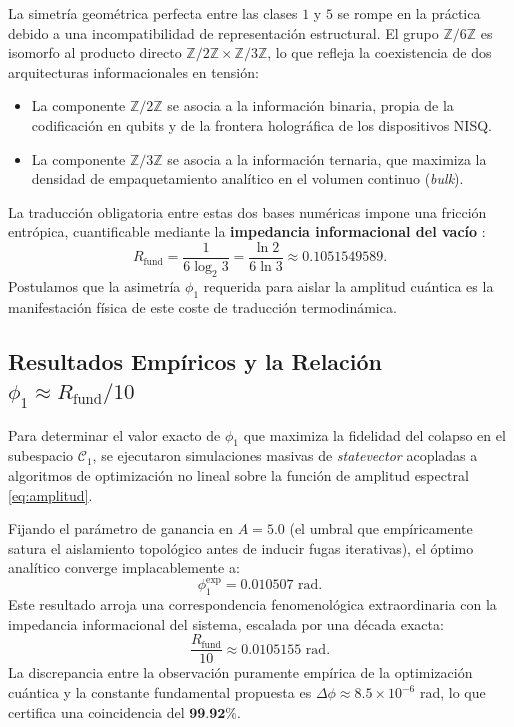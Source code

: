 \documentclass[12pt,a4paper]{article}
\theoremstyle{plain}
\theoremstyle{definition}
\theoremstyle{remark}
\begin{document}
La simetría geométrica perfecta entre las clases $1$ y $5$ se rompe en la práctica debido a una incompatibilidad de representación estructural. El grupo $\mathbb{Z}/6\mathbb{Z}$ es isomorfo al producto directo $\mathbb{Z}/2\mathbb{Z} \times \mathbb{Z}/3\mathbb{Z}$, lo que refleja la coexistencia de dos arquitecturas informacionales en tensión:
\begin{itemize}
    \item La componente $\mathbb{Z}/2\mathbb{Z}$ se asocia a la información binaria, propia de la codificación en qubits y de la frontera holográfica de los dispositivos NISQ.
    \item La componente $\mathbb{Z}/3\mathbb{Z}$ se asocia a la información ternaria, que maximiza la densidad de empaquetamiento analítico en el volumen continuo (\textit{bulk}).
\end{itemize}
La traducción obligatoria entre estas dos bases numéricas impone una fricción entrópica, cuantificable mediante la \textbf{impedancia informacional del vacío} \cite{PeinadorGenesis}:
\begin{equation}
R_{\text{fund}} = \frac{1}{6\log_2 3} = \frac{\ln 2}{6\ln 3} \approx 0.1051549589.
\label{eq:rfund}
\end{equation}
Postulamos que la asimetría $\phi_1$ requerida para aislar la amplitud cuántica es la manifestación física de este coste de traducción termodinámica.

\subsection{Resultados Empíricos y la Relación $\phi_1 \approx R_{\text{fund}}/10$}

Para determinar el valor exacto de $\phi_1$ que maximiza la fidelidad del colapso en el subespacio $\mathcal{C}_1$, se ejecutaron simulaciones masivas de \textit{statevector} acopladas a algoritmos de optimización no lineal sobre la función de amplitud espectral \eqref{eq:amplitud}. 

Fijando el parámetro de ganancia en $A = 5.0$ (el umbral que empíricamente satura el aislamiento topológico antes de inducir fugas iterativas), el óptimo analítico converge implacablemente a:
\begin{equation}
\phi_1^{\text{exp}} = 0.010507 \text{ rad}.
\end{equation}
Este resultado arroja una correspondencia fenomenológica extraordinaria con la impedancia informacional del sistema, escalada por una década exacta:
\begin{equation}
\frac{R_{\text{fund}}}{10} \approx 0.0105155 \text{ rad}.
\end{equation}
La discrepancia entre la observación puramente empírica de la optimización cuántica y la constante fundamental propuesta es $\Delta\phi \approx 8.5 \times 10^{-6}$ rad, lo que certifica una coincidencia del $\textbf{99.92\%}$. 
\end{document}
